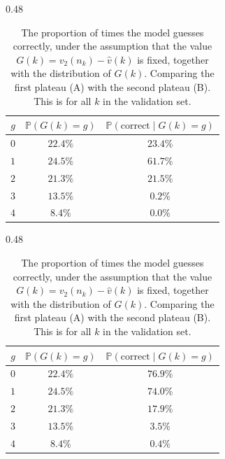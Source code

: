 \documentclass[12pt]{amsart}%
\newcommand{\1}{\mathds{1}}
\theoremstyle{definition}
\numberwithin{equation}{section}
\numberwithin{table}{section}
\numberwithin{figure}{section}
\begin{document}
\begin{table}[ht]
  \centering
  \begin{subtable}[t]{0.48\linewidth}
    \centering
    \begin{tabular}{ccc}
      \toprule
      $g$ & $\mathbb{P}(G(k)=g)$ & $\mathbb{P}(\text{correct}\mid G(k)=g)$ \\
      \midrule
      $0$ & $22.4\%$ & $23.4\%$ \\
      $1$ & $24.5\%$ & $61.7\%$ \\
      $2$ & $21.3\%$ & $21.5\%$ \\
      $3$ & $13.5\%$ & $0.2\%$  \\
      $4$ & $8.4\%$  & $0.0\%$  \\
      \bottomrule
    \end{tabular}
    \caption{Epoch $40$ (first plateau).}
    \label{tab:correct_epoch40}
  \end{subtable}
  \hfill
  \begin{subtable}[t]{0.48\linewidth}
    \centering
    \begin{tabular}{ccc}
      \toprule
      $g$ & $\mathbb{P}(G(k)=g)$ & $\mathbb{P}(\text{correct}\mid G(k)=g)$ \\
      \midrule
      $0$ & $22.4\%$ & $76.9\%$ \\
      $1$ & $24.5\%$ & $74.0\%$ \\
      $2$ & $21.3\%$ & $17.9\%$ \\
      $3$ & $13.5\%$ & $3.5\%$  \\
      $4$ & $8.4\%$  & $0.4\%$  \\
      \bottomrule
    \end{tabular}
    \caption{Epoch $210$ (second plateau).}
    \label{tab:correct_epoch210}
  \end{subtable}
  \caption{The proportion of times the model guesses correctly, under the assumption
    that the value $G(k) = v_2(n_k) - \hat{v}(k)$ is fixed, together with the
    distribution of $G(k)$. Comparing the first plateau (A) with the second plateau (B). This is for all $k$ in the validation set.}
  \label{tab:correct_by_G}
\end{table}
\end{document}
